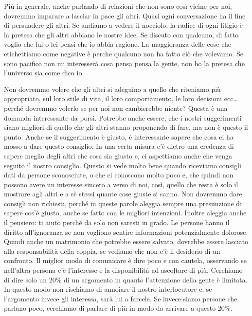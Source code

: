 \documentclass[12pt]{book} %
\begin{document}
Più in generale, anche parlando di relazioni che non sono così vicine per noi, dovremmo imparare a lasciar in pace gli
altri. Quasi ogni conversazione ha il fine di persuadere gli altri. Se andiamo a vedere il nocciolo, la radice di ogni litigio è la pretesa che gli altri abbiano le nostre idee.
Se discuto con qualcuno, di fatto voglio che lui o lei pensi che io abbia ragione.
La maggioranza delle cose che etichettiamo come negative è perche qualcuno non ha fatto ciò che volevamo. Se sono pacifico non mi interesserà cosa pensa pensa la gente, non ho la pretesa che l'universo sia come dico io.

Non dovremmo volere che gli altri si adeguino a quello che
riteniamo più appropriato, sul loro stile di vita, il loro comportamento, le loro decisioni ecc… perché dovremmo
volerlo se per noi non cambierebbe niente? Questa è una domanda interessante da porsi. Potrebbe anche essere, che i
nostri suggerimenti siano migliori di quello che gli altri stanno proponendo di fare, ma non è questo il punto. Anche
se il suggerimento è giusto, è interessante sapere che cosa ci ha mosso a dare questo consiglio. In una certa misura
c'è dietro una credenza di sapere meglio degli altri che cosa sia giusto e, ci aspettiamo anche
che venga seguito il nostro consiglio. Questo si vede molto bene quando riceviamo consigli dati da persone sconosciute, 
o che ci conoscono molto poco e, che quindi non possono avere un
interesse sincero a verso di noi, così, quello che resta è solo il mostrare agli altri e a sè stessi quante cose
giuste si sanno. Non dovremmo dare consigli non richiesti, perché in queste parole aleggia sempre una presunzione di
sapere cos'è giusto, anche se fatto con le migliori intenzioni. Inoltre aleggia anche il pensiero:
ti aiuto perché da solo non saresti in grado.
Le persone hanno il diritto all'ignoranza se non vogliono sentire informazioni potenzialmente
dolorose. Quindi anche un matrimonio che potrebbe essere salvato, dovrebbe essere lasciato alla responsabilità della
coppia, se vediamo che non c'è il desiderio di un confronto. Il miglior modo di comunicare è dire
poco e con cautela, osservando se nell'altra persona c'è l'interesse e la disponibilità ad ascoltare di più.
Cerchiamo di dire solo un 20\% di un argomento in quanto l'attenzione della gente è limitata. In questo modo non rischiamo di annoiare il nostro interlocutore e, se l'argomento invece gli interessa, sarà lui a farcele. Se invece siamo persone che parlano poco, cerchiamo di parlare di più in modo da arrivare a questo 20\%.
\end{document}
